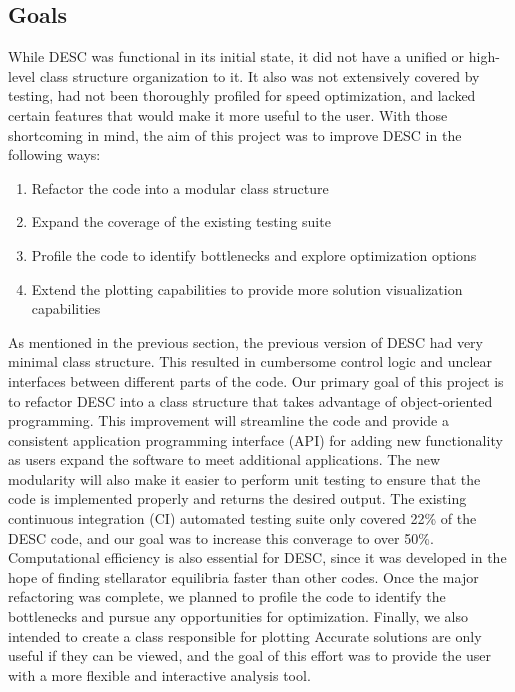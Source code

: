 \documentclass{article}
\begin{document}
\subsection{Goals}

While DESC was functional in its initial state, it did not have a unified or high-level class structure organization to it.
It also was not extensively covered by testing, had not been thoroughly profiled for speed optimization, and lacked certain features that would make it more useful to the user.
With those shortcoming in mind, the aim of this project was to improve DESC in the following ways:
%
\begin{enumerate}
\item Refactor the code into a modular class structure
\item Expand the coverage of the existing testing suite
\item Profile the code to identify bottlenecks and explore optimization options
\item Extend the plotting capabilities to provide more solution visualization capabilities
\end{enumerate}

As mentioned in the previous section, the previous version of DESC had very minimal class structure.
This resulted in cumbersome control logic and unclear interfaces between different parts of the code.
Our primary goal of this project is to refactor DESC into a class structure that takes advantage of object-oriented programming.
This improvement will streamline the code and provide a consistent application programming interface (API) for adding new functionality as users expand the software to meet additional applications.
The new modularity will also make it easier to perform unit testing to ensure that the code is implemented properly and returns the desired output.
The existing continuous integration (CI) automated testing suite only covered 22\% of the DESC code, and our goal was to increase this converage to over 50\%.
Computational efficiency is also essential for DESC, since it was developed in the hope of finding stellarator equilibria faster than other codes.
Once the major refactoring was complete, we planned to profile the code to identify the bottlenecks and pursue any opportunities for optimization.
Finally, we also intended to create a class responsible for plotting 
Accurate solutions are only useful if they can be viewed, and the goal of this effort was to provide the user with a more flexible and interactive analysis tool.
\end{document}

